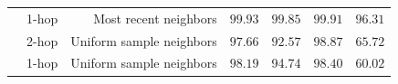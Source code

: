 \begin{table}[h]
{\begin{tabular}{ l rr  ll ll }
                                                                              & \cellcolor[HTML]{FEDEDC}1-hop & \cellcolor[HTML]{FEDEDC}Most recent neighbors& \cellcolor[HTML]{FEDEDC}$\mathbf{99.93}$ & \cellcolor[HTML]{FEDEDC}$\mathbf{99.85}$ & \cellcolor[HTML]{FEDEDC}$\mathbf{99.91}$ &  \cellcolor[HTML]{FEDEDC}$\mathbf{96.31}$  \\
                                                                              & 2-hop & Uniform sample  neighbors  & $97.66$ &  $92.57$ &  $98.87$    &     $65.72$    \\
                                                                              & 1-hop & Uniform sample neighbors   &  $98.19$ & 94.74     &  $98.40$     &     $60.02$            \\\hline
\hline
\end{tabular}}
\vspace{-3mm}
\end{table}



